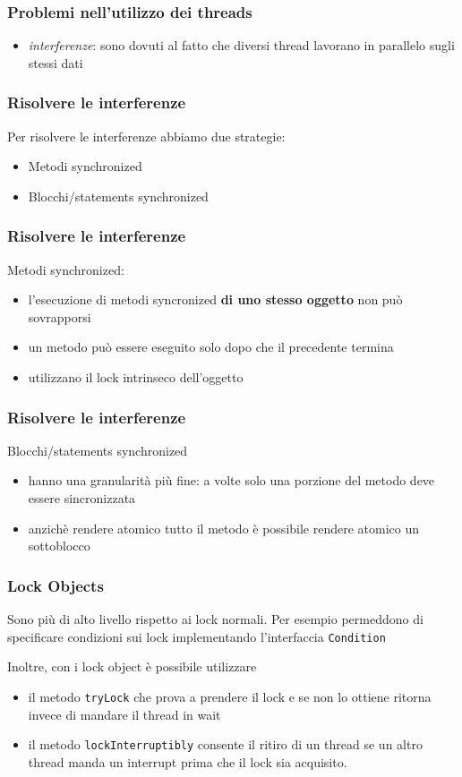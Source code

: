 \documentclass{beamer}
\begin{document}
\begin{frame}
\frametitle{Problemi nell'utilizzo dei threads}
\begin{itemize}
\item \emph{interferenze}: sono dovuti al fatto che diversi thread lavorano in parallelo sugli stessi dati
\end{itemize}
\end{frame}





\begin{frame}
\frametitle{Risolvere le interferenze}
Per risolvere le interferenze abbiamo due strategie:
\begin{itemize}
\item Metodi synchronized
\item Blocchi/statements synchronized
\end{itemize}
\end{frame}

\begin{frame}
\frametitle{Risolvere le interferenze}
Metodi synchronized:
\begin{itemize}
\item l'esecuzione di metodi syncronized \textbf{di uno stesso oggetto} non pu\`o sovrapporsi
\item un metodo pu\`o essere eseguito solo dopo che il precedente termina
\item utilizzano il lock intrinseco dell'oggetto
\end{itemize}
\end{frame}

\begin{frame}
\frametitle{Risolvere le interferenze}
 Blocchi/statements synchronized
\begin{itemize}
\item hanno una granularit\`a pi\`u fine: a volte solo una porzione del metodo deve essere sincronizzata
\item anzich\`e rendere atomico tutto il metodo \`e possibile rendere atomico un sottoblocco
\end{itemize}
\end{frame}



\begin{frame}
\frametitle{Lock Objects}
Sono pi\`u di alto livello rispetto ai lock normali. Per esempio permeddono di specificare condizioni sui lock implementando l'interfaccia \texttt{Condition}

Inoltre, con i lock object \`e possibile utilizzare 
\begin{itemize}
\item il metodo \texttt{tryLock} che prova a prendere il lock e se non lo ottiene ritorna invece di mandare il thread in wait
\item il metodo \texttt{lockInterruptibly} consente il ritiro di un thread se un altro thread manda un interrupt prima che il lock sia acquisito.
\end{itemize}
\end{frame}
\end{document}
